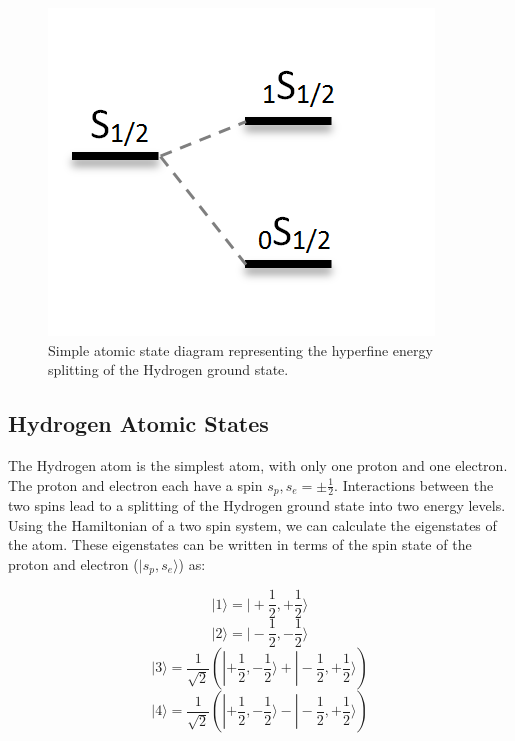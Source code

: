 \begin{figure}[htb]
\begin{center}
\includegraphics[width=0.6\linewidth]{Introduction/figures/1s_spin_states.png}
\caption{Simple atomic state diagram representing the hyperfine energy splitting of the Hydrogen ground state. }
\label{Fig:spin_states}
\end{center}
\end{figure}


\subsection{Hydrogen Atomic States}

The Hydrogen atom is the simplest atom, with only one proton and one electron. The proton and electron each have a spin $s_p,s_e = \pm \frac{1}{2}$. Interactions between the two spins lead to a splitting of the Hydrogen ground state into two energy levels. Using the Hamiltonian of a two spin system, we can calculate the eigenstates of the atom. These eigenstates can be written in terms of the spin state of the proton and electron ($| s_p, s_e \rangle$) as:

\begin{equation}
| 1 \rangle = | + \frac{1}{2}, + \frac{1}{2} \rangle 
\end{equation}
\begin{equation}
| 2 \rangle = | - \frac{1}{2} , - \frac{1}{2} \rangle 
\end{equation}
\begin{equation}
| 3 \rangle = \frac{1}{\sqrt{2}} (| + \frac{1}{2}, - \frac{1}{2} \rangle + |- \frac{1}{2}, + \frac{1}{2} \rangle) 
\end{equation}
\begin{equation}
| 4 \rangle = \frac{1}{\sqrt{2}} (| + \frac{1}{2}, - \frac{1}{2} \rangle - |- \frac{1}{2}, + \frac{1}{2} \rangle)
\end{equation}


